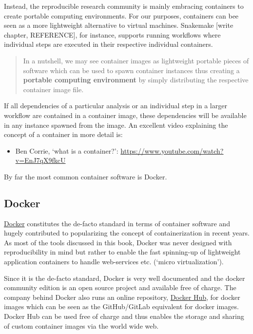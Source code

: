 \documentclass[]{book}
\providecommand{\tightlist}{%
  \setlength{\itemsep}{0pt}\setlength{\parskip}{0pt}}
\begin{document}
Instead, the reproducible research community is mainly embracing
containers to create portable computing environments. For our purposes,
containers can bee seen as a more lightweight alternative to virtual
machines. Snakemake {[}write chapter, REFERENCE{]}, for instance,
supports running workflows where individual steps are executed in their
respective individual containers.

\begin{quote}
In a nutshell, we may see container images as lightweight portable
pieces of software which can be used to spawn container instances thus
creating a \textbf{portable computing environment} by simply
distributing the respective container image file.
\end{quote}

If all dependencies of a particular analysis or an individual step in a
larger workflow are contained in a container image, these dependencies
will be available in any instance spawned from the image. An excellent
video explaining the concept of a container in more detail is:

\begin{itemize}
\tightlist
\item
  Ben Corrie, `what is a container?':
  \url{https://www.youtube.com/watch?v=EnJ7qX9fkcU}
\end{itemize}

By far the most common container software is Docker.

\subsection{Docker}\label{sct-docker}

\href{https://www.docker.com/}{Docker} constitutes the de-facto standard
in terms of container software and hugely contributed to popularizing
the concept of containerization in recent years. As most of the tools
discussed in this book, Docker was never designed with reproducibility
in mind but rather to enable the fast spinning-up of lightweight
application containers to handle web-services etc. (`micro
virtualization').

Since it is the de-facto standard, Docker is very well documented and
the docker community edition is an open source project and available
free of charge. The company behind Docker also runs an online
repository, \href{https://www.docker.com/products/docker-hub}{Docker
Hub}, for docker images which can be seen as the GitHub/GitLab
equivalent for docker images. Docker Hub can be used free of charge and
thus enables the storage and sharing of custom container images via the
world wide web.
\end{document}
